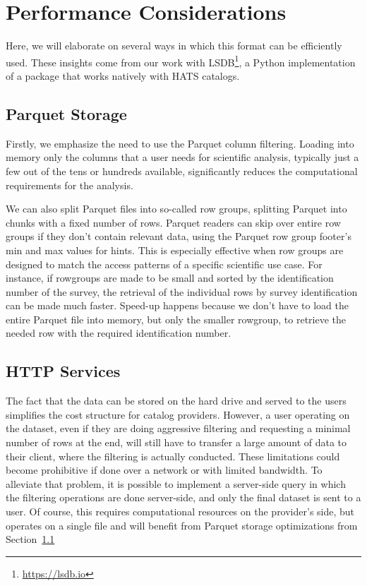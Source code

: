 \documentclass[11pt,a4paper]{ivoa}
\begin{document}
\section{Performance Considerations}
Here, we will elaborate on several ways in which this format can be efficiently used. These insights come from our work with LSDB\footnote{\url{https://lsdb.io}}, a Python implementation of a package that works natively with HATS catalogs. \par

\subsection{Parquet Storage}\label{sec:parquetPerformance}
Firstly, we emphasize the need to use the Parquet column filtering. 
Loading into memory only the columns that a user needs for scientific analysis, typically just a few out of the tens or hundreds available, significantly reduces the computational requirements for the analysis.  \par 

We can also split Parquet files into so-called row groups, splitting Parquet into chunks with a fixed number of rows. 
Parquet readers can skip over entire row groups if they don't contain relevant data, using the Parquet row group footer's min and max values for hints. 
This is especially effective when row groups are designed to match the access patterns of a specific scientific use case. 
For instance, if rowgroups are made to be small and sorted by the identification number of the survey, the retrieval of the individual rows by survey identification can be made much faster. 
Speed-up happens because we don't have to load the entire Parquet file into memory, but only the smaller rowgroup, to retrieve the needed row with the required identification number.\par 

\subsection{HTTP Services}
The fact that the data can be stored on the hard drive and served to the users simplifies the cost structure for catalog providers. 
However, a user operating on the dataset, even if they are doing aggressive filtering and requesting a minimal number of rows at the end, will still have to transfer a large amount of data to their client, where the filtering is actually conducted. 
These limitations could become prohibitive if done over a network or with limited bandwidth. 
To alleviate that problem, it is possible to implement a server-side query in which the filtering operations are done server-side, and only the final dataset is sent to a user. 
Of course, this requires computational resources on the provider's side, but operates on a single file and will benefit from Parquet storage optimizations from Section~\ref{sec:parquetPerformance}
\end{document}
